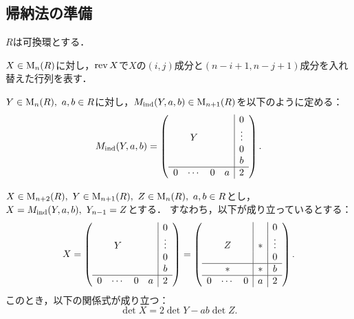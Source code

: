 \subsection{帰納法の準備}

$R$は可換環とする．

\begin{definition}
  \label{def:CartanMatrix.rev}
  \leanok
  $X \in \operatorname{M}_n(R)$に対し，$\operatorname{rev} X$で$X$の$(i, j)$成分と$(n - i + 1, n - j + 1)$成分を入れ替えた行列を表す．
\end{definition}

\begin{definition}
  \label{def:CartanMatrix.ind_matrix}
  \leanok
  $Y \in \operatorname{M}_n(R),\ a, b \in R$に対し，$M_{\operatorname{ind}}(Y, a, b) \in \operatorname{M}_{n+1}(R)$を以下のように定める：
  \begin{equation}
    M_{\operatorname{ind}}(Y, a, b)
    = \left(
      \begin{array}{cccc|c}
        & & & & 0 \\
        & Y & & & \vdots \\
        & & & & 0 \\
        & & & & b \\ \hline
        0 & \cdots & 0 & a & 2
      \end{array}
    \right).
  \end{equation}
\end{definition}

\begin{lemma}
  \label{lem:CartanMatrix.ind_det}
  \leanok
  $X \in \operatorname{M}_{n+2}(R),\ Y \in \operatorname{M}_{n+1}(R),\ Z \in \operatorname{M}_n(R),\ a, b \in R$とし，$X = M_{\operatorname{ind}}(Y, a, b),\ Y_{n-1} = Z$とする．
  すなわち，以下が成り立っているとする：
  \begin{equation}
    X
    =\left(
      \begin{array}{cccc|c}
        & & & & 0 \\
        & Y & & & \vdots \\
        & & & & 0 \\
        & & & & b \\ \hline
        0 & \cdots & 0 & a & 2
      \end{array}
    \right)
    = \left(
      \begin{array}{ccc|c|c}
        & & & & 0 \\
        & Z & & * & \vdots \\
        & & & & 0 \\ \hline
        & * & & * & b \\ \hline
        0 & \cdots & 0 & a & 2
      \end{array}
    \right).
  \end{equation}
  このとき，以下の関係式が成り立つ：
  \begin{equation}
    \det X = 2 \det Y - ab \det Z.
  \end{equation}
\end{lemma}

